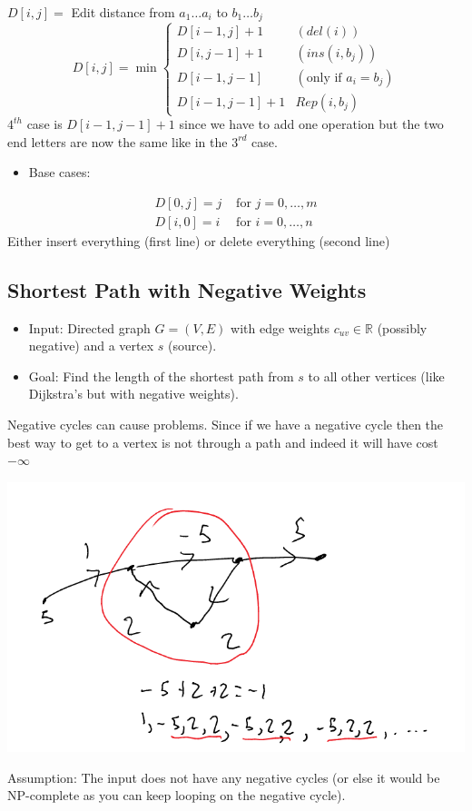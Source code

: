 \documentclass[11pt]{article}
\begin{document}
\(D[i,j]=\) Edit distance from \(a_1 \ldots a_i\) to \(b_1 \ldots b_j\)
\begin{equation*}
D[i,j] = \min 
\begin{cases}
D[i-1,j]+1 & (del(i))
\\ D[i,j-1]+1 & (ins(i,b_j))
\\ D[i-1, j-1] & (\text{only if $a_i=b_j$})
\\ D[i-1, j-1]+1 & Rep(i,b_j)
\end{cases}
\end{equation*}
\(4^{th}\) case is \(D[i-1, j-1]+1\) since we have to add one operation but the two end letters are now the same like in the \(3^{rd}\) case.
\begin{itemize}
\item Base cases:
\end{itemize}
\begin{align*}
D[0,j] = j & \text{ for }j=0,\ldots,m
\\D[i,0] = i & \text{ for }i=0,\ldots,n
\end{align*}
Either insert everything (first line) or delete everything (second line)
\subsection{Shortest Path with Negative Weights}
\label{sec:org6d70c70}
\begin{itemize}
\item Input: Directed graph \(G=(V,E)\) with edge weights \(c_{uv}\in \mathbb{R}\) (possibly negative) and a vertex \(s\) (source).
\item Goal: Find the length of the shortest path from \(s\) to all other vertices (like Dijkstra's but with negative weights).
\end{itemize}
Negative cycles can cause problems. Since if we have a negative cycle then the best way to get to a vertex is not through a path and indeed it will have cost \(-\infty\)
\begin{center}
\includegraphics[width=.9\linewidth]{./Images/i93.png}
\end{center}
Assumption: The input does not have any negative cycles (or else it would be NP-complete as you can keep looping on the negative cycle).
\end{document}
